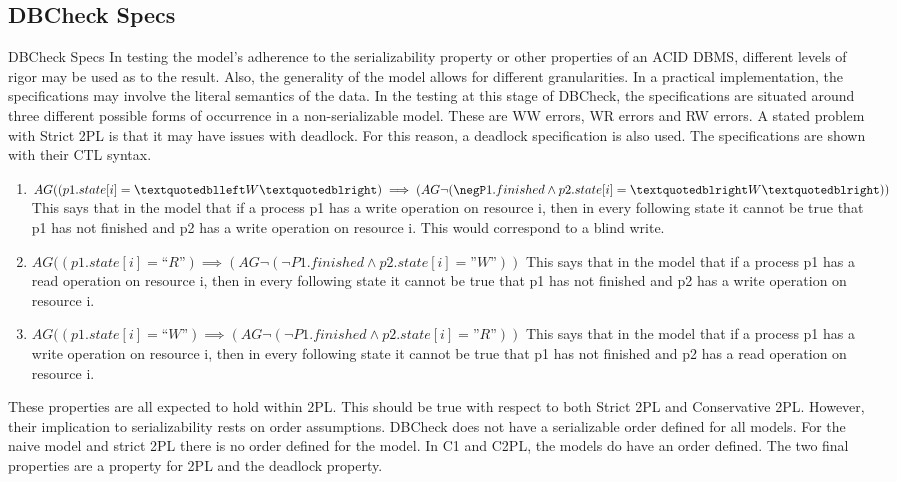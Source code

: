 \subsection{DBCheck Specs}
DBCheck Specs
In testing the model’s adherence to the serializability property or other properties of an ACID DBMS, different levels of rigor may be used as to the result. Also, the generality of the model allows for different granularities. In a practical implementation,  the specifications may involve the literal semantics of the data. In the testing at this stage of DBCheck, the specifications are situated around three different possible forms of occurrence in a non-serializable model. These are WW errors, WR errors and RW errors. A stated problem with Strict 2PL is that it may have issues with deadlock. For this reason, a deadlock specification is also used. The specifications are shown with their CTL syntax.
\begin{enumerate}
\item $AG ((p1.state[i] = “W”)  \implies (AG \neg( \negP1.finished \land p2.state[i]=”W”))$
This says that in the model that if a process p1 has a write operation on resource i, then in every following state it cannot be true that p1 has not finished and p2 has a write operation on resource i. This would correspond to a blind write. 
\item $AG ((p1.state[i] = “R”)  \implies (AG \neg(\neg P1.finished \land p2.state[i]=”W”))$
This says that in the model that if a process p1 has a read operation on resource i, then in every following state it cannot be true that p1 has not finished and p2 has a write operation on resource i.
\item $AG ((p1.state[i] = “W”)  \implies (AG \neg(\neg P1.finished \land p2.state[i]=”R”))$
This says that in the model that if a process p1 has a write operation on resource i, then in every following state it cannot be true that p1 has not finished and p2 has a read operation on resource i.
\end{enumerate}

These properties are all expected to hold within 2PL. This should be true with respect to both Strict 2PL and Conservative 2PL. However, their implication to serializability rests on order assumptions. DBCheck does not have a serializable order defined for all models. For the naive model and strict 2PL there is no order defined for the model. In C1 and C2PL, the models do have an order defined.  The two final properties are a property for 2PL and the deadlock property. 

